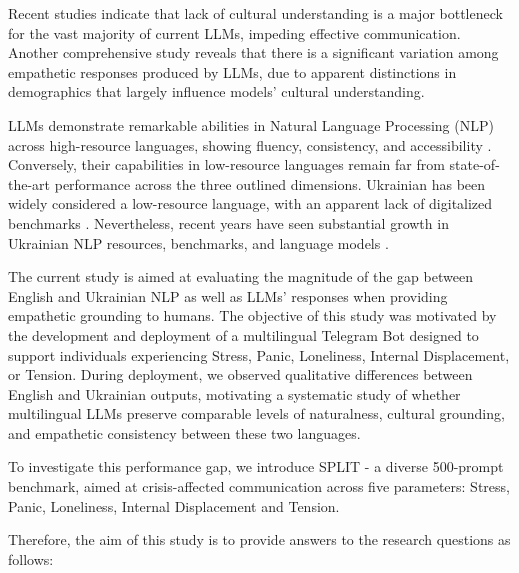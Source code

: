 \documentclass[10pt, twocolumn]{article}
\begin{document}
Recent studies indicate \cite{vayani2025languagesmatterevaluatinglmms} that lack of cultural understanding is a major bottleneck for the vast majority of current LLMs, impeding effective communication. Another comprehensive study reveals \cite{malik-etal-2025-llms} that there is a significant variation among empathetic responses produced by LLMs, due to apparent distinctions in demographics that largely influence models' cultural understanding.

LLMs demonstrate remarkable abilities in Natural Language Processing (NLP) across high-resource languages, showing fluency, consistency, and accessibility \cite{Pakray_Gelbukh_Bandyopadhyay_2025}. Conversely, their capabilities in low-resource languages remain far from state-of-the-art performance \cite{han2025mubenchassessmentmultilingualcapabilities, he2025xcompsmultilingualbenchmarkconceptual, maheshwari2026indicparambenchmarkevaluatellms} across the three outlined dimensions. Ukrainian has been widely considered a low-resource language, with an apparent lack of digitalized benchmarks \cite{Syromiatnikov_2025}. Nevertheless, recent years have seen substantial growth in Ukrainian NLP resources, benchmarks, and language models \cite{Syromiatnikov_2025}.

The current study is aimed at evaluating the magnitude of the gap between English and Ukrainian NLP \cite{joshi2021statefatelinguisticdiversity} as well as LLMs' responses when providing empathetic grounding \cite{arjmand2024empathic} to humans. The objective of this study was motivated by the development and deployment of a multilingual Telegram Bot designed to support individuals experiencing Stress, Panic, Loneliness, Internal Displacement, or Tension. During deployment, we observed qualitative differences between English and Ukrainian outputs, motivating a systematic study of whether multilingual LLMs preserve comparable levels of naturalness, cultural grounding, and empathetic consistency between these two languages.

To investigate this performance gap, we introduce SPLIT - a diverse 500-prompt benchmark, aimed at crisis-affected communication across five parameters: Stress, Panic, Loneliness, Internal Displacement and Tension. 

Therefore, the aim of this study is to provide answers to the research questions as follows:
\end{document}

